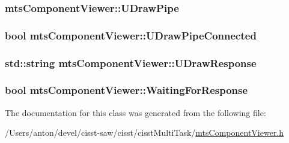 \subsubsection[{U\+Draw\+Pipe}]{ mts\+Component\+Viewer\+::\+U\+Draw\+Pipe\hspace{0.3cm}{\ttfamily [protected]}}\label{classmts_component_viewer_a4f2747dc20890be285fa6b031516c6dc}
\hypertarget{classmts_component_viewer_a7590f5f827427231d8fe2bd813feb22e}{}
\subsubsection[{U\+Draw\+Pipe\+Connected}]{\setlength{\rightskip}{0pt plus 5cm}bool mts\+Component\+Viewer\+::\+U\+Draw\+Pipe\+Connected\hspace{0.3cm}{\ttfamily [protected]}}\label{classmts_component_viewer_a7590f5f827427231d8fe2bd813feb22e}
\hypertarget{classmts_component_viewer_acae080559e0ab6cbb24070743348d9aa}{}
\subsubsection[{U\+Draw\+Response}]{\setlength{\rightskip}{0pt plus 5cm}std\+::string mts\+Component\+Viewer\+::\+U\+Draw\+Response\hspace{0.3cm}{\ttfamily [protected]}}\label{classmts_component_viewer_acae080559e0ab6cbb24070743348d9aa}
\hypertarget{classmts_component_viewer_ad0d7132119ce154a8e7b646153ae0cc0}{}
\subsubsection[{Waiting\+For\+Response}]{\setlength{\rightskip}{0pt plus 5cm}bool mts\+Component\+Viewer\+::\+Waiting\+For\+Response\hspace{0.3cm}{\ttfamily [protected]}}\label{classmts_component_viewer_ad0d7132119ce154a8e7b646153ae0cc0}


The documentation for this class was generated from the following file\+:\begin{DoxyCompactItemize}
\item 
/\+Users/anton/devel/cisst-\/saw/cisst/cisst\+Multi\+Task/\hyperlink{mts_component_viewer_8h}{mts\+Component\+Viewer.\+h}\end{DoxyCompactItemize}
